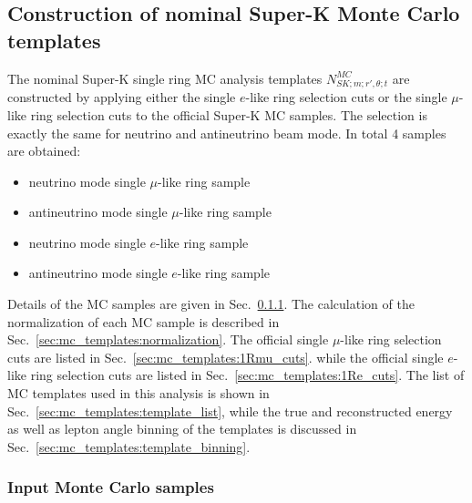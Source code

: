 
\subsection {Construction of nominal Super-K Monte Carlo templates}
\label{sec:mc_templates}

The nominal Super-K single ring MC analysis templates $N_{SK;m;r\prime,\theta;t}^{MC}$
are constructed by applying either the single $e$-like ring selection cuts 
or the single $\mu$-like ring selection cuts 
to the official Super-K MC samples.
The selection is exactly the same for neutrino and antineutrino beam mode.
In total 4 samples are obtained:
\begin{itemize}
\item neutrino mode single $\mu$-like ring sample  
\item antineutrino mode single $\mu$-like ring sample  
\item neutrino mode single $e$-like ring sample  
\item antineutrino mode single $e$-like ring sample  
\end{itemize}
Details of the MC samples are given in Sec.~\ref{sec:mc_templates:input_mc}.
The calculation of the normalization of each MC sample is described in Sec.~\ref{sec:mc_templates:normalization}.
The official single $\mu$-like ring selection cuts are listed in Sec.~\ref{sec:mc_templates:1Rmu_cuts}.
while the official single $e$-like ring selection cuts are listed in Sec.~\ref{sec:mc_templates:1Re_cuts}.
The list of MC templates used in this analysis is shown in Sec.~\ref{sec:mc_templates:template_list},
while the true and reconstructed energy as well as lepton angle binning of the templates is discussed 
in Sec.~\ref{sec:mc_templates:template_binning}.

\subsubsection {Input Monte Carlo samples}
\label{sec:mc_templates:input_mc}



